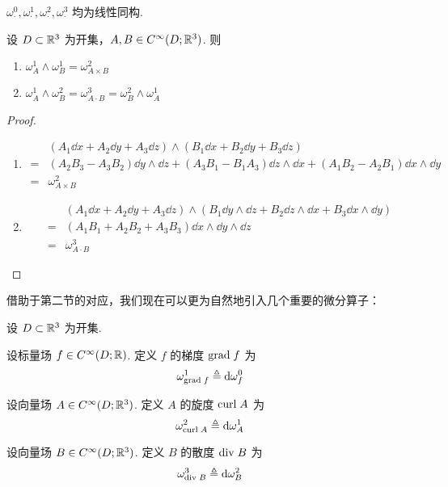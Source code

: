 \begin{property}
    $\omega_\cdot^0,\omega_\cdot^1,\omega_\cdot^2,\omega_\cdot^3$ 均为线性同构.
\end{property}

\begin{property}
    设 $D\subset\mathbb{R}^3$ 为开集，$A,B\in C^\infty(D;\mathbb{R}^3)$. 则

    \begin{enumerate}
        \item $\omega_A^1\wedge\omega_B^1=\omega_{A\times B}^2$
        
        \item $\omega_A^1\wedge\omega_B^2=\omega_{A\cdot B}^3=\omega_B^2\wedge\omega_A^1$
    \end{enumerate}
\end{property}
\begin{proof}
    \begin{enumerate}
        \item
$$
\begin{aligned}
    &(A_1\dd x+A_2\dd y+A_3\dd z)\wedge(B_1\dd x+B_2\dd y+B_3\dd z)\\
    =&(A_2B_3-A_3B_2)\dd y\wedge\dd z+(A_3B_1-B_1A_3)\dd z\wedge\dd x+(A_1B_2-A_2B_1)\dd x\wedge\dd y\\
    =&\omega_{A\times B}^2
\end{aligned}
$$

        \item
$$
\begin{aligned}
    &(A_1\dd x+A_2\dd y+A_3\dd z)\wedge(B_1\dd y\wedge\dd z+B_2\dd z\wedge\dd x+B_3\dd x\wedge\dd y)\\
    =&(A_1B_1+A_2B_2+A_3B_3)\dd x\wedge\dd y\wedge\dd z\\
    =&\omega_{A\cdot B}^3
\end{aligned}
$$
    \end{enumerate}
\end{proof}


借助于第二节的对应，我们现在可以更为自然地引入几个重要的微分算子：

\begin{definition}
    设 $D\subset\mathbb{R}^3$ 为开集.
    
    设标量场 $f\in C^\infty(D;\mathbb{R})$. 定义 $f$ 的梯度 $\mathrm{grad}\; f$ 为
$$
\omega_{\mathrm{grad}\; f}^1\triangleq\mathrm{d}\omega_f^0
$$

    设向量场 $A\in C^\infty(D;\mathbb{R}^3)$. 定义 $A$ 的旋度 $\mathrm{curl}\; A$ 为
$$
\omega_{\mathrm{curl}\; A}^2\triangleq\mathrm{d}\omega_A^1
$$

    设向量场 $B\in C^\infty(D;\mathbb{R}^3)$. 定义 $B$ 的散度 $\mathrm{div}\; B$ 为
$$
\omega_{\mathrm{div}\; B}^3\triangleq\mathrm{d}\omega_B^2
$$
\end{definition}

